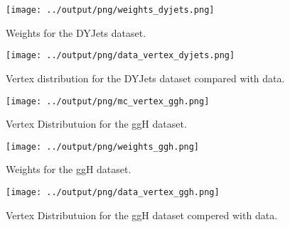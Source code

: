 \documentclass[11pt]{book}
\begin{document}
\begin{figure}[htb]
\centering
\texttt{[image: ../output/png/weights\_dyjets.png]}
\caption{Weights for the DYJets dataset.}
\label{fig:weight_dyjets}
\end{figure}

\begin{figure}[htb]
\centering
\texttt{[image: ../output/png/data\_vertex\_dyjets.png]}
\caption{Vertex distribution for the DYJets dataset compared with data.}
\label{fig:data_vertex_dyjets}
\end{figure}

\begin{figure}[htb]
\centering
\texttt{[image: ../output/png/mc\_vertex\_ggh.png]}
\caption{Vertex Distributuion for the ggH dataset.}
\label{fig:mc_vertex_ggh}
\end{figure}

\begin{figure}[htb]
\centering
\texttt{[image: ../output/png/weights\_ggh.png]}
\caption{Weights for the ggH dataset.}
\label{fig:weight_ggh}
\end{figure}

\begin{figure}[htb]
\centering
\texttt{[image: ../output/png/data\_vertex\_ggh.png]}
\caption{Vertex Distributuion for the ggH dataset compered with data.}
\label{fig:data_vertex_ggh}
\end{figure}
\end{document}
